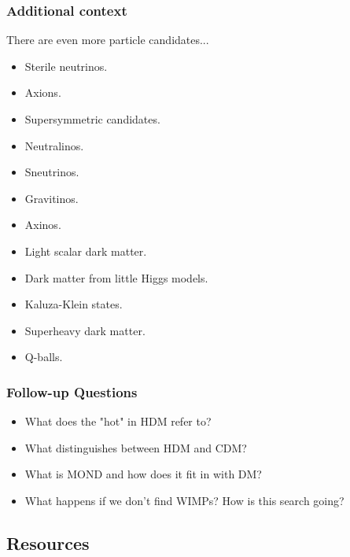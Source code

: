 \documentclass[a4paper,11pt]{article}
\begin{document}
\subsubsection{Additional context}

{\noindent}There are even more particle candidates...

\begin{itemize}
    \item Sterile neutrinos.
    \item Axions. 
    \item Supersymmetric candidates.
        \item Neutralinos.
        \item Sneutrinos.
        \item Gravitinos.
        \item Axinos.
    \item Light scalar dark matter.
    \item Dark matter from little Higgs models.
    \item Kaluza-Klein states.
    \item Superheavy dark matter.
    \item Q-balls.
\end{itemize}

\subsubsection{Follow-up Questions}

\begin{itemize}
    \item What does the "hot" in HDM refer to?
    \item What distinguishes between HDM and CDM?
    \item What is MOND and how does it fit in with DM?
    \item What happens if we don't find WIMPs? How is this search going?
\end{itemize}


\newpage
\subsection{Resources}
\end{document}
